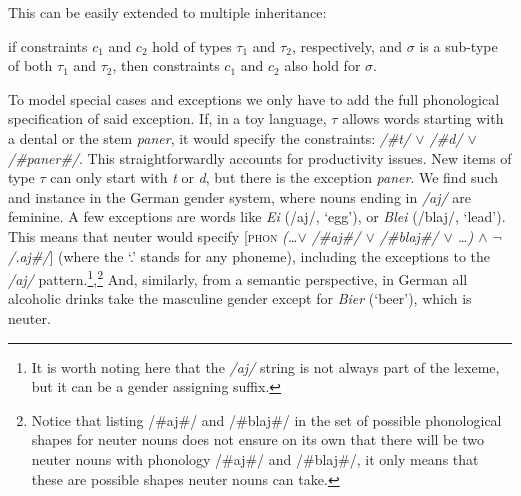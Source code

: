 This can be easily extended to multiple inheritance:

\begin{exe}
    \ex if constraints $c_1$ and $c_2$ hold of types $\tau_1$ and $\tau_2$, respectively, and $\sigma$ is a sub-type of both $\tau_1$ and $\tau_2$, then constraints $c_1$ and $c_2$ also hold for $\sigma$.
\end{exe}

To model special cases and exceptions we only have to add the full phonological specification of said exception. If, in a toy language, $\tau$ allows words starting with a dental or the stem \textit{paner}, it would specify the constraints: \textit{/\#t/ $\lor$ /\#d/ $\lor$ /\#paner\#/}. This straightforwardly accounts for productivity issues. New items of type $\tau$ can only start with \textit{t} or \textit{d}, but there is the exception \textit{paner}. We find such and instance in the German gender system, where nouns ending in \textit{/aj/} are feminine. A few exceptions are words like \textit{Ei} (/aj/, `egg'), or \textit{Blei} (/blaj/, `lead'). This means that neuter would specify [\textsc{phon} \textit{(\dots  $\lor$ /\#aj\#/ $\lor$ /\#blaj\#/ $\lor$ \dots) $\land$ $\lnot$/.aj\#/}] (where the `.' stands for any phoneme), including the exceptions to the \textit{/aj/} pattern.\footnote{It is worth noting here that the \textit{/aj/} string is not always part of the lexeme, but it can be a gender assigning suffix.},\footnote{Notice that listing /\#aj\#/ and /\#blaj\#/ in the set of possible phonological shapes for neuter nouns does not ensure on its own that there will be two neuter nouns with phonology /\#aj\#/ and /\#blaj\#/, it only means that these are possible shapes neuter nouns can take.} And, similarly, from a semantic perspective, in German all alcoholic drinks take the masculine gender except for \textit{Bier} (`beer'), which is neuter.

